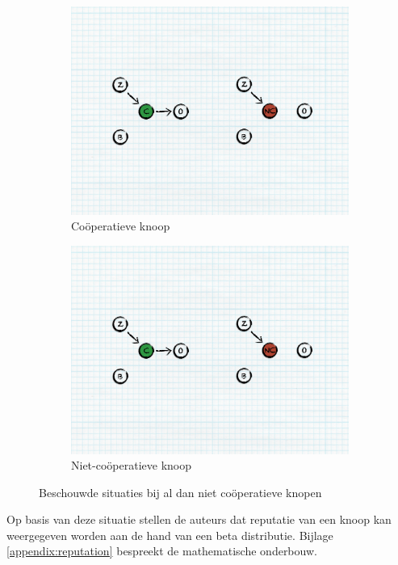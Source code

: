 \begin{figure}
\centering
\begin{subfigure}{.49\textwidth}
\centering
  \includegraphics[width=.8\linewidth]{./resources/cooperative.pdf}
  \caption{Co\"operatieve knoop}
  \label{fig:reputation-cooperative-node}
\end{subfigure}
\begin{subfigure}{.49\textwidth}
\centering
  \includegraphics[width=.8\linewidth]{./resources/non-cooperative.pdf}
  \caption{Niet-co\"operatieve knoop}
  \label{fig:reputation-uncooperative-node}
\end{subfigure}
\caption{Beschouwde situaties bij al dan niet co\"operatieve knopen}
\label{fig:reputation-cooperation}
\end{figure}

Op basis van deze situatie stellen de auteurs dat reputatie van een knoop kan
weergegeven worden aan de hand van een beta distributie. Bijlage
\ref{appendix:reputation} bespreekt de mathematische onderbouw.

